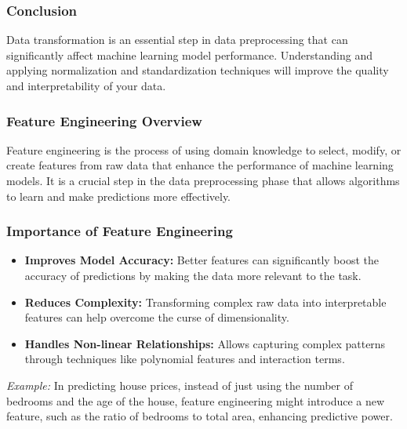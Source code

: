 \documentclass[aspectratio=169]{beamer}
\begin{document}
\begin{frame}[fragile]
    \frametitle{Conclusion}
    Data transformation is an essential step in data preprocessing that can significantly affect machine learning model performance. Understanding and applying normalization and standardization techniques will improve the quality and interpretability of your data.
\end{frame}

\begin{frame}[fragile]
    \frametitle{Feature Engineering Overview}
    Feature engineering is the process of using domain knowledge to select, modify, or create features from raw data that enhance the performance of machine learning models. 
    It is a crucial step in the data preprocessing phase that allows algorithms to learn and make predictions more effectively.
\end{frame}

\begin{frame}[fragile]
    \frametitle{Importance of Feature Engineering}
    \begin{itemize}
        \item \textbf{Improves Model Accuracy:} Better features can significantly boost the accuracy of predictions by making the data more relevant to the task.
        \item \textbf{Reduces Complexity:} Transforming complex raw data into interpretable features can help overcome the curse of dimensionality.
        \item \textbf{Handles Non-linear Relationships:} Allows capturing complex patterns through techniques like polynomial features and interaction terms.
    \end{itemize}

    \textit{Example:} In predicting house prices, instead of just using the number of bedrooms and the age of the house, feature engineering might introduce a new feature, such as the ratio of bedrooms to total area, enhancing predictive power.
\end{frame}
\end{document}
